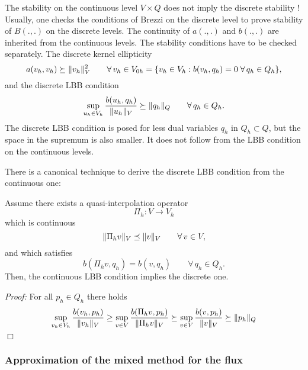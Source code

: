 The stability on the continuous level $V \times Q$ does not imply the
discrete stability ! Usually, one checks the conditions of Brezzi 
on the discrete level to prove stability of $B(.,.)$ on the discrete
levels. The continuity of $a(.,.)$ and $b(.,.)$ are inherited from the
continuous levels. The stability conditions have to be checked separately.
The discrete kernel ellipticity
\begin{equation}
a(v_h,v_h) \succeq \| v_h \|_V^2 \qquad \forall \, v_h \in V_{0h} = \{ v_h \in V_h : b(v_h,q_h) = 0 \; \forall \, q_h \in Q_h \},
\end{equation}
and the discrete LBB condition
\begin{equation}
\sup_{u_h \in V_h} \frac{b(u_h, q_h)}{ \| u_h \|_V } \succeq \| q_h \|_Q \qquad \forall \, q_h \in Q_h.
\end{equation}
The discrete LBB condition is posed for less dual variables $q_h$ in $Q_h \subset Q$, 
but the space in the supremum is also smaller. It does not follow 
from the LBB condition on the continuous levels.

There is a canonical technique to derive the discrete LBB condition from
the continuous one:
\begin{lemma} \label{lemma_cont2discr_lbb} Assume there exists a quasi-interpolation operator
$$
\Pi_h : V \rightarrow V_h 
$$
which is continuous
$$
\| \Pi_h v \|_V \preceq \| v \|_V \qquad \forall \, v \in V,
$$
and which satisfies 
$$
b(\Pi_h v, q_h) = b(v,q_h) \qquad \forall \, q_h \in Q_h.
$$
Then, the continuous LBB condition implies the discrete one.
\end{lemma}
{\em Proof:} For all $p_h \in Q_h$ there holds
$$
\sup_{v_h \in V_h} \frac { b(v_h, p_h) }{\| v_h \|_V}
\geq 
\sup_{v \in V} \frac{b(\Pi_h v,p_h)}{\| \Pi_h v\|_V}
\succeq 
\sup_{v \in V} \frac{b(v, p_h)}{  \| v \|_V }
\succeq
\| p_h \|_Q
$$
\hfill $\Box$


\subsubsection{Approximation of the mixed method for the flux}

